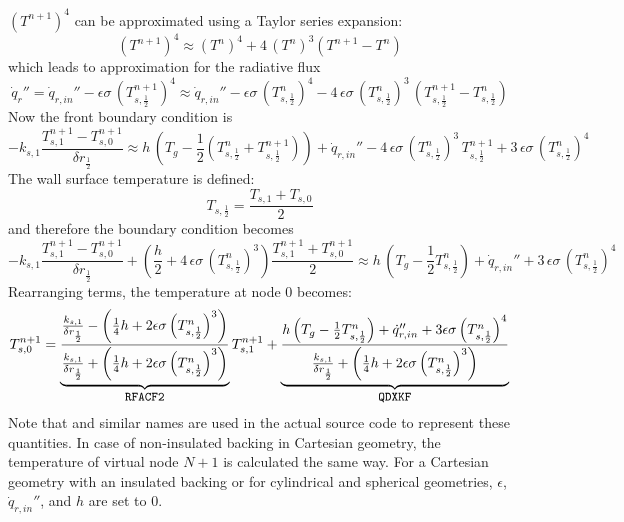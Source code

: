 $(T^{n+1})^4$ can be approximated using a Taylor series expansion:
\begin{equation}
\label{T_taylor}
(T^{n+1})^4 \approx (T^n)^4 + 4 \, (T^n)^3 (T^{n+1}-T^n)
\end{equation}
which leads to approximation for the radiative flux
\begin{equation}
\label{radi}
\dot{q}_r'' = \dot{q}_{r, in}'' - \epsilon \sigma \, \left( T_{s,\frac{1}{2}}^{n+1} \right)^4
  \approx \dot{q}_{r, in}'' - \epsilon \sigma \, \left( T_{s,\frac{1}{2}}^n \right)^4 - 4 \, \epsilon\sigma \, \left( T_{s,\frac{1}{2}}^n \right)^3 \, \left( T_{s,\frac{1}{2}}^{n+1}-T_{s,\frac{1}{2}}^n \right)
\end{equation}
Now the front boundary condition is
\begin{equation}
\label{bc_front_2}
  -k_{s,1} \frac{T_{s,1}^{n+1}-T_{s,0}^{n+1}}{\delta r_{\frac{1}{2}}}
  \approx h \, \left( T_g - \frac{1}{2} \left( T_{s,\frac{1}{2}}^n+T_{s,\frac{1}{2}}^{n+1} \right) \right) +
  \dot{q}_{r, in}'' - 4 \, \epsilon\sigma \, \left(T_{s,\frac{1}{2}}^n \right)^3 \, T_{s,\frac{1}{2}}^{n+1} + 3 \, \epsilon\sigma \, \left( T_{s,\frac{1}{2}}^n \right)^4
\end{equation}
The wall surface temperature is defined:
\begin{equation}
\label{T_front}
  T_{s,\frac{1}{2}} = \frac{T_{s,1}+T_{s,0}}{2}
\end{equation}
and therefore the boundary condition becomes
\begin{equation}
\label{bc_front_4}
  -k_{s,1} \frac{T_{s,1}^{n+1}-T_{s,0}^{n+1}}{\delta r_{\frac{1}{2}}} + \left( \frac{h}{2} + 4 \, \epsilon\sigma \, \left( T_{s,\frac{1}{2}}^n \right)^3 \right) \frac{T_{s,1}^{n+1}+T_{s,0}^{n+1}}{2}
  \approx h\, \left( T_g - \frac{1}{2}T_{s,\frac{1}{2}}^n \right) +
  \dot{q}_{r, in}'' + 3 \, \epsilon\sigma \, \left( T_{s,\frac{1}{2}}^n \right)^4
\end{equation}
Rearranging terms, the temperature at node 0 becomes:
\begin{equation}
\label{T0}
  T_{s,0}^{n+1} = \underbrace{\frac{\frac{k_{s,1}}{\delta r_{\frac{1}{2}}}- \left(\frac{1}{4}h+2\epsilon \sigma \left(T_{s,\frac{1}{2}}^n\right)^3 \right)}{\frac{k_{s,1}}{\delta r_{\frac{1}{2}}} + \left(\frac{1}{4}h+2\epsilon \sigma \left( T_{s,\frac{1}{2}}^n\right)^3 \right)}}_{\texttt{\small RFACF2}} T_{s,1}^{n+1} +
 \underbrace{\frac{h \left(T_g-\frac{1}{2}T_{s,\frac{1}{2}}^n\right)+\dot{q}_{r,in}''+3\epsilon \sigma \left( T_{s,\frac{1}{2}}^n\right)^4}{\frac{k_{s,1}}{\delta r_{\frac{1}{2}}}+\left(\frac{1}{4}h+2\epsilon \sigma \left( T_{s,\frac{1}{2}}^n\right)^3 \right)}}_{\texttt{\small QDXKF}}
\end{equation}
Note that  and similar names are used in the actual source code to represent these quantities.
In case of non-insulated backing in Cartesian geometry, the temperature of virtual node $N+1$ is calculated the same way.
For a Cartesian geometry with an insulated backing or for cylindrical and spherical geometries, $\epsilon$, $\dot{q}_{r,in}''$, and $h$ are set to 0.

